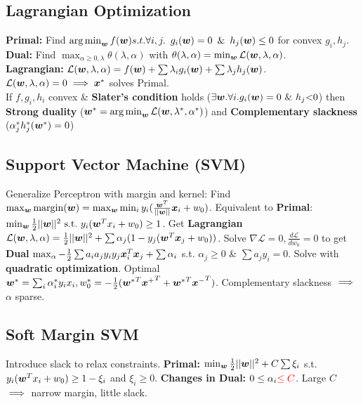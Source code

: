 \subsection*{Lagrangian Optimization}
\textbf{Primal:} Find $\operatorname*{arg\,min}_{\bm{w}} f({\bm{w}})\\s.t. \forall i,j.\,\,\,g_i({\bm{w}})=0\,\,\,\&\,\,\,h_j({\bm{w}}) \leq 0$ for convex $g_i, h_j$.\\
\textbf{Dual:} Find $\max_{\alpha\geq0,\lambda} {\theta(\lambda, \alpha)}$ with ${\theta(\lambda, \alpha)} = \min_{\bm{w}}\mathcal{L}({\bm{w}}, \lambda, \alpha)$.\\
\textbf{Lagrangian:} $\mathcal{L}({\bm{w}}, \mathbf{\lambda}, \mathbf{\alpha}) = f({\bm{w}}) + \sum\lambda_i g_i({\bm{w}}) + \sum\lambda_j h_j({\bm{w}})$.\\
$\mathcal{L}({\bm{w}}, \mathbf{\lambda}, \mathbf{\alpha})=0 \implies {\bm{x}}^*$ solves Primal.\\
If $f, g_i, h_i$ convex \& \textbf{Slater's condition} holds \mbox{($\exists {\bm{w}}. \forall i. g_i({\bm{w}})=0\,\,\&\,\,h_j\mathbf{<}0$)} then \textbf{Strong duality} (${\bm{w}}^* = \operatorname*{arg\,min}_{\bm{w}} \mathcal{L}({\bm{w}}, \lambda^*, \alpha^*)$) and \textbf{Complementary slackness} ($\alpha^*_jh^*_j({\bm{w}}^*) = 0$)


\subsection*{Support Vector Machine (SVM)}
Generalize Perceptron with margin and kernel:
Find $\max_{\bm{w}} \mathrm{margin}({\bm{w}}) = \max_{\bm{w}}\min_i y_i(\frac{{\bm{w}}^T}{||{\bm{w}}||}{\bm{x}}_i + w_0)$. Equivalent to \textbf{Primal}: $\min_{\bm{w}} \frac{1}{2}||{\bm{w}}||^2\,\,\mathrm{s.t.}\,\, y_i({\bm{w}}^Tx_i+w_0) \geq 1$. Get \textbf{Lagrangian} $\mathcal{L}({\bm{w}}, \lambda, \alpha) = \frac{1}{2}||{\bm{w}}||^2 + \sum\alpha_j (1-y_j({\bm{w}}^T{\bm{x}}_j+w_0))$. Solve $\nabla\mathcal{L}=0, \frac{d\mathcal{L}}{dw_0}=0$ to get \textbf{Dual} $\max_\alpha -\frac{1}{2}\sum a_ia_jy_iy_j{\bm{x}}^T_i{\bm{x}}_j + \sum\alpha_i$ s.t.
$\alpha_j\geq 0$ \& $\sum a_jy_i = 0$. Solve with \textbf{quadratic optimization}. Optimal ${\bm{w}}^* = \sum_i \alpha^*_i y_i x_i, w_0^* = -\frac{1}{2}({{\bm{w}}^*}^T{{\bm{x}}^+}^T + {{\bm{w}}^*}^T{{\bm{x}}^-}^T)$. Complementary slackness $\color{black}\implies$ $\alpha$ sparse.
\subsection*{Soft Margin SVM}
Introduce slack to relax constraints.
\textbf{Primal:} $\min_{\bm{w}} \frac{1}{2}||{\bm{w}}||^2 + C\sum\xi_i$ s.t. $y_i({\bm{w}}^Tx_i+w_0) \geq 1-\xi_i$ and $\xi_i \geq 0$.
\textbf{Changes in Dual:} $0\leq\alpha_i{\color{red}\leq C}$.
Large $C$ $\color{black}\implies$ narrow margin, little slack. 

